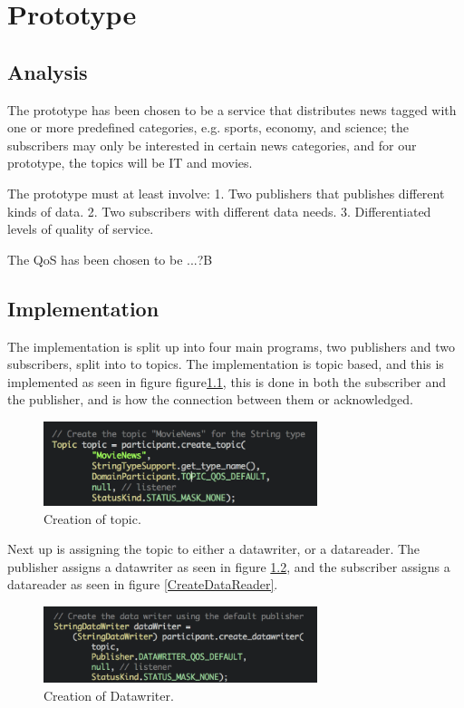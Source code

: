 \chapter{Prototype}
\section{Analysis}
The prototype has been chosen to be a service that distributes news tagged with one or more predefined categories,
e.g. sports, economy, and science; the subscribers may only be interested in certain news
categories, and for our prototype, the topics will be IT and movies.

The prototype must at least involve:
1. Two publishers that publishes different kinds of data.
2. Two subscribers with different data needs.
3. Differentiated levels of quality of service.

The QoS has been chosen to be ...?B

\section{Implementation}
The implementation is split up into four main programs, two publishers and two subscribers, split into to topics. The implementation is topic based, and this is implemented as seen in figure figure\ref{TopicCreation}, this is done in both the subscriber and the publisher, and is how the connection between them or acknowledged.

\begin{figure}[ht!]
\centering
\includegraphics[width=80mm]{img/TopicCreation.png}
\caption{Creation of topic.}
\label{TopicCreation}
\end{figure}

Next up is assigning the topic to either a datawriter, or a datareader. The publisher assigns a datawriter as seen in figure \ref{CreateDataWriter}, and the subscriber assigns a datareader as seen in figure \ref{CreateDataReader}.

\begin{figure}[ht!]
\centering
\includegraphics[width=80mm]{img/CreateDataWriter.png}
\caption{Creation of Datawriter.}
\label{CreateDataWriter}
\end{figure}

